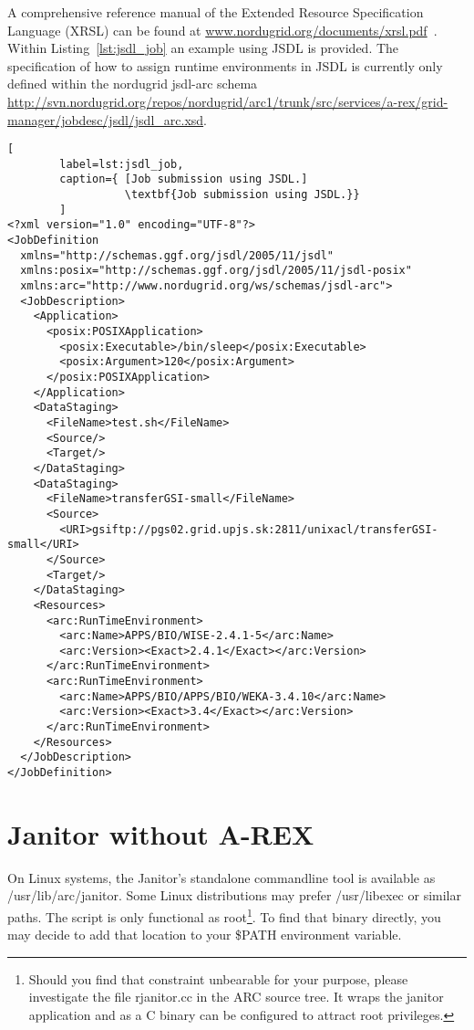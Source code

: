 A comprehensive reference manual of the Extended
Resource Specification Language (XRSL) can be found at
\href{www.nordugrid.org/documents/xrsl.pdf}{www.nordugrid.org/documents/xrsl.pdf}~\cite{NORDUGRID_MANUAL_4}.
Within Listing~\ref{lst:jsdl_job} an example using JSDL is provided. The
specification of how to assign runtime environments in JSDL is currently
only defined within the nordugrid jsdl-arc schema~
\href{http://svn.nordugrid.org/repos/nordugrid/arc1/trunk/src/services/a-rex/grid-manager/jobdesc/jsdl/jsdl_arc.xsd}
     {http://svn.nordugrid.org/repos/nordugrid/arc1/trunk/src/services/a-rex/grid-manager/jobdesc/jsdl/jsdl\_arc.xsd}.
\begin{lstlisting}[
        label=lst:jsdl_job,
        caption={ [Job submission using JSDL.]
                  \textbf{Job submission using JSDL.}}
        ]
<?xml version="1.0" encoding="UTF-8"?>
<JobDefinition
  xmlns="http://schemas.ggf.org/jsdl/2005/11/jsdl"
  xmlns:posix="http://schemas.ggf.org/jsdl/2005/11/jsdl-posix"
  xmlns:arc="http://www.nordugrid.org/ws/schemas/jsdl-arc">
  <JobDescription>
    <Application>
      <posix:POSIXApplication>
        <posix:Executable>/bin/sleep</posix:Executable>
        <posix:Argument>120</posix:Argument>
      </posix:POSIXApplication>
    </Application>
    <DataStaging>
      <FileName>test.sh</FileName>
      <Source/>
      <Target/>
    </DataStaging>
    <DataStaging>
      <FileName>transferGSI-small</FileName>
      <Source>
        <URI>gsiftp://pgs02.grid.upjs.sk:2811/unixacl/transferGSI-small</URI>
      </Source>
      <Target/>
    </DataStaging>
    <Resources>
      <arc:RunTimeEnvironment>
        <arc:Name>APPS/BIO/WISE-2.4.1-5</arc:Name>
        <arc:Version><Exact>2.4.1</Exact></arc:Version>
      </arc:RunTimeEnvironment>
      <arc:RunTimeEnvironment>
        <arc:Name>APPS/BIO/APPS/BIO/WEKA-3.4.10</arc:Name>
        <arc:Version><Exact>3.4</Exact></arc:Version>
      </arc:RunTimeEnvironment>
    </Resources>
  </JobDescription>
</JobDefinition>
\end{lstlisting}


\section{Janitor without A-REX}

On Linux systems, the Janitor's standalone commandline tool is
available as /usr/lib/arc/janitor.  Some Linux distributions may
prefer /usr/libexec or similar paths.  The script is only functional as
root\footnote{Should you find that constraint unbearable for your purpose,
please investigate the file rjanitor.cc in the ARC source tree. It wraps
the janitor application and as a C binary can be configured to attract
root privileges.}.  To find that binary directly, you may decide to add
that location to your \$PATH environment variable.

